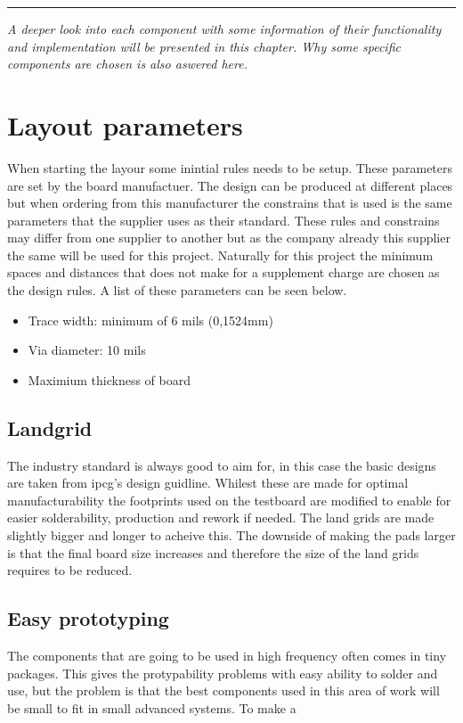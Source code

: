 
\vspace{-10ex}%
\rule{\textwidth}{0.3pt}
\vspace{5ex}

\textit{
A deeper look into each component with some information of their functionality and implementation will be presented in this chapter. Why some specific components are chosen is also aswered here. 
}
\vspace{5ex}



\section{Layout parameters}

When starting the layour some inintial rules needs to be setup. These parameters are set by the board manufactuer.
The design can be produced at different places but when ordering from this manufacturer the constrains that is used is the same parameters that the supplier uses as their standard.
These rules and constrains may differ from one supplier to another but as the company already this supplier the same will be used for this project.
Naturally for this project the minimum spaces and distances that does not make for a supplement charge are chosen as the design rules. A list of these parameters can be seen below.

\begin{itemize}
\item Trace width: minimum of 6 mils (0,1524mm) 
\item Via diameter: 10 mils
\item Maximium thickness of board

\end{itemize}
 
\subsection{Landgrid}
The industry standard is always good to aim for, in this case the basic designs are taken from \gls{ipcg}'s design guidline\cite{ipcg}. Whilest these are made for optimal manufacturability the footprints used on the testboard are modified to enable for easier solderability, production and rework if needed. The land grids are made slightly bigger and longer to acheive this. The downside of making the pads larger is that the final board size increases and therefore the size of the land grids requires to be reduced.

\subsection{Easy prototyping}
The components that are going to be used in high frequency often comes in tiny packages. This gives the protypability problems with easy ability to solder and use, but the problem is that the best components used in this area of work will be small to fit in small advanced systems. To make a

